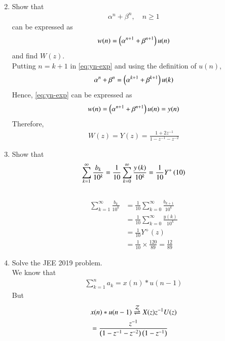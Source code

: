 \documentclass[journal,12pt,twocolumn]{IEEEtran}
\renewcommand\thesection{\arabic{section}}
\begin{document}
\begin{enumerate}[label=\thesection.\arabic*,ref=\thesection.\theenumi]
\begin{align}
\end{align}
\item Show that 
\begin{align}
	\alpha^n + \beta^n, \quad n \ge 1
    \label{eq:yn-exp}
\end{align}
can be expressed as 
\begin{align}
	w(n) = \left(\alpha^{n+1} + \beta^{n+1}\right)u(n)
\end{align}
and find $W(z)$.
\\
\solution Putting $n = k + 1$ in \eqref{eq:yn-exp} and using the definition of $u(n)$, 
\begin{align}
\alpha^n + \beta^n = \left(\alpha^{k + 1} + \beta^{k + 1}\right)u(k)
\end{align}
Hence, \eqref{eq:yn-exp} can be expressed as
\begin{align}
w(n) = \left(\alpha^{n+1} + \beta^{n+1}\right)u(n) = y(n)
\end{align}
Therefore,
\begin{align}
    W(z) = Y(z) = \frac{1 + 2z^{-1}}{1 - z^{-1} - z^{-2}}
\end{align}
 \item Show that 
\begin{align}
	\sum_{k=1}^{\infty}\frac{b_k}{10^k} =
	\frac{1}{10}\sum_{k=0}^{\infty}\frac{y\left(k\right)}{10^k} =\frac{1}{10}Y^{+}\left({10}\right)
\end{align}
\label{pr:1-4}
\\
\solution
\begin{align}
    \sum_{k=1}^{\infty}\frac{b_k}{10^k} &= \frac{1}{10}\sum_{k = 0}^{\infty}\frac{b_{k+1}}{10^k} \\
                                        &= \frac{1}{10}\sum_{k = 0}^{\infty}\frac{y(k)}{10^k} \\
                                        &= \frac{1}{10}Y^+(z) \\
                                        &= \frac{1}{10}\times\frac{120}{89} = \frac{12}{89}
\end{align}
\item Solve the JEE 2019 problem.
\\
\solution We know that
\begin{align}
    \sum_{k = 1}^{n}a_k = x(n)*u(n - 1)
\end{align}
But
\begin{align}
    &x(n)*u(n - 1) \ztrans X(z)z^{-1}U(z) \\
    &= \frac{z^{-1}}{\brak{1 - z^{-1} - z^{-2}}\brak{1 - z^{-1}}} \\

\end{align}
\end{enumerate}
\end{document}
